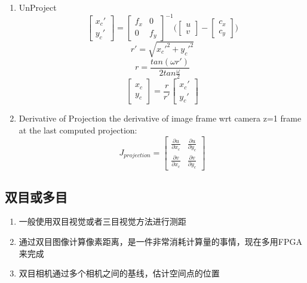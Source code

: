 \begin{enumerate}
\item UnProject
\begin{equation}
\left[\begin{array}{c}{x_c}'\\{y_c}'\end{array}\right] =
\left[\begin{array}{cc}f_x&0\\0&f_y\end{array}\right]^{-1}
\Biggl(
\left[\begin{array}{c}u\\v\end{array}\right] -  
\left[\begin{array}{c}c_x\\c_y\end{array}\right]
\Biggr)
\end{equation}
\begin{equation} r' = \sqrt{ {{x_c}'}^2+{{y_c}'}^2 } \end{equation}
\begin{equation} r = \frac{tan(\omega r')}{2tan\frac{\omega}{2}} \end{equation}
\begin{equation}
\left[\begin{array}{c}x_c\\y_c\end{array}\right] =
\frac{r}{r'}
\left[\begin{array}{c}{x_c}'\\{y_c}'\end{array}\right]
\end{equation}

\item Derivative of Projection
the derivative of image frame wrt camera z=1 frame at the last computed projection: \newline
\begin{equation}
J_{projection} =
\left[\begin{array}{cc}\frac{\partial{u}}{\partial{x_c}}&\frac{\partial{u}}{\partial{y_c}}\\\frac{\partial{v}}{\partial{x_c}}&\frac{\partial{v}}{\partial{y_c}}\end{array}\right]  
\end{equation}

\end{enumerate}

\subsection{双目或多目}
\begin{enumerate}
\item 一般使用双目视觉或者三目视觉方法进行测距
\item 通过双目图像计算像素距离，是一件非常消耗计算量的事情，现在多用FPGA来完成
\item 双目相机通过多个相机之间的基线，估计空间点的位置
\end{enumerate}


